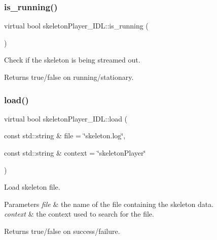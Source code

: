\subsubsection{\texorpdfstring{is\_running()}{is\_running()}}
{\footnotesize\ttfamily virtual bool skeleton\+Player\+\_\+\+I\+D\+L\+::is\+\_\+running (\begin{DoxyParamCaption}{ }\end{DoxyParamCaption})\hspace{0.3cm}{\ttfamily [virtual]}}



Check if the skeleton is being streamed out. 

\begin{DoxyReturn}{Returns}
true/false on running/stationary. 
\end{DoxyReturn}
\mbox{\label{classskeletonPlayer__IDL_ac34bafdeb8df497435c9c3da9d8dee5b}} 
\subsubsection{\texorpdfstring{load()}{load()}}
{\footnotesize\ttfamily virtual bool skeleton\+Player\+\_\+\+I\+D\+L\+::load (\begin{DoxyParamCaption}\item[{const std\+::string \&}]{file = {\ttfamily \char`\"{}skeleton.log\char`\"{}},  }\item[{const std\+::string \&}]{context = {\ttfamily \char`\"{}skeletonPlayer\char`\"{}} }\end{DoxyParamCaption})\hspace{0.3cm}{\ttfamily [virtual]}}



Load skeleton file. 


\begin{DoxyParams}{Parameters}
{\em file} & the name of the file containing the skeleton data. \\
\hline
{\em context} & the context used to search for the file. \\
\hline
\end{DoxyParams}
\begin{DoxyReturn}{Returns}
true/false on success/failure. 
\end{DoxyReturn}
\mbox{\label{classskeletonPlayer__IDL_a0419e3b52e359f4b1fe9c8efba2db38e}} 
